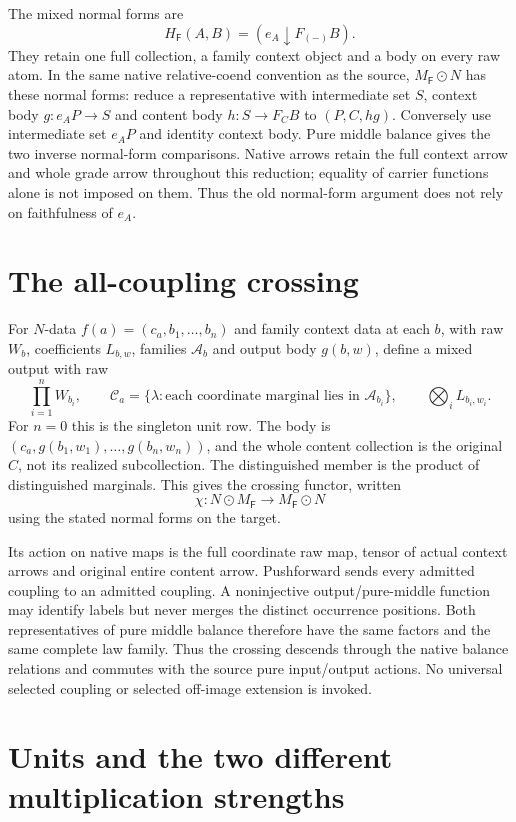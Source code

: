 \documentclass[11pt]{article}
\begin{document}
The mixed normal forms are
\[
 H_{\mathsf F}(A,B)=(e_A\downarrow F_{(-)}B).
\]
They retain one full collection, a family context object and a body on every raw atom. In the same native relative-coend convention as the source, $M_{\mathsf F}\odot N$ has these normal forms: reduce a representative with intermediate set $S$, context body $g:e_AP\to S$ and content body $h:S\to F_CB$ to $(P,C,hg)$. Conversely use intermediate set $e_AP$ and identity context body. Pure middle balance gives the two inverse normal-form comparisons. Native arrows retain the full context arrow and whole grade arrow throughout this reduction; equality of carrier functions alone is not imposed on them. Thus the old normal-form argument does not rely on faithfulness of $e_A$.

\section{The all-coupling crossing}
For $N$-data $f(a)=(c_a,b_1,\ldots,b_n)$ and family context data at each $b$, with raw $W_b$, coefficients $L_{b,w}$, families $\mathcal A_b$ and output body $g(b,w)$, define a mixed output with raw
\[
 \prod_{i=1}^nW_{b_i},\qquad
 \mathcal C_a=\{\lambda:\text{each coordinate marginal lies in }\mathcal A_{b_i}\},
 \qquad \bigotimes_i L_{b_i,w_i}.
\]
For $n=0$ this is the singleton unit row. The body is $(c_a,g(b_1,w_1),\ldots,g(b_n,w_n))$, and the whole content collection is the original $C$, not its realized subcollection. The distinguished member is the product of distinguished marginals. This gives the crossing functor, written
\[
 \chi:N\odot M_{\mathsf F}\longrightarrow M_{\mathsf F}\odot N
\]
using the stated normal forms on the target.

Its action on native maps is the full coordinate raw map, tensor of actual context arrows and original entire content arrow. Pushforward sends every admitted coupling to an admitted coupling. A noninjective output/pure-middle function may identify labels but never merges the distinct occurrence positions. Both representatives of pure middle balance therefore have the same factors and the same complete law family. Thus the crossing descends through the native balance relations and commutes with the source pure input/output actions. No universal selected coupling or selected off-image extension is invoked.

\section{Units and the two different multiplication strengths}
\end{document}
